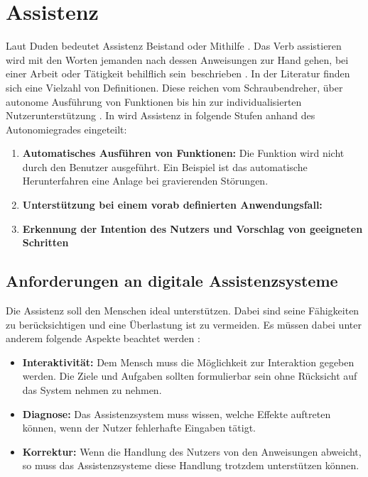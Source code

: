 \section{Assistenz}
Laut Duden bedeutet Assistenz Beistand oder Mithilfe \cite{DudenAssistenz}. Das Verb assistieren wird mit den Worten \glqq jemanden nach dessen Anweisungen zur Hand gehen, bei einer Arbeit oder Tätigkeit behilflich sein\grqq \ beschrieben \cite{DudenAssistieren}. In der Literatur finden sich eine Vielzahl von Definitionen. Diese reichen vom Schraubendreher, über autonome Ausführung von Funktionen bis hin zur individualisierten Nutzerunterstützung \cite{Ludwig}. In \cite{Wandke2005} wird Assistenz in folgende Stufen anhand des Autonomiegrades eingeteilt:
\begin{enumerate}
\item \textbf{Automatisches Ausführen von Funktionen:} Die Funktion wird nicht durch den Benutzer ausgeführt. Ein Beispiel ist das automatische Herunterfahren eine Anlage bei gravierenden Störungen.
\item \textbf{Unterstützung bei einem vorab definierten Anwendungsfall:}
\item \textbf{Erkennung der Intention des Nutzers und Vorschlag von geeigneten Schritten}
\end{enumerate}



\subsection{Anforderungen an digitale Assistenzsysteme}
Die Assistenz soll den Menschen ideal unterstützen. Dabei sind seine Fähigkeiten zu berücksichtigen und eine Überlastung ist zu vermeiden. Es müssen dabei unter anderem folgende Aspekte beachtet werden \cite{Ludwig}:
\begin{itemize}
\item \textbf{Interaktivität:} Dem Mensch muss die Möglichkeit zur Interaktion gegeben werden. Die Ziele und Aufgaben sollten formulierbar sein ohne Rücksicht auf das System nehmen zu nehmen.
\item \textbf{Diagnose:} Das Assistenzsystem muss wissen, welche Effekte auftreten können, wenn der Nutzer fehlerhafte Eingaben tätigt.
\item \textbf{Korrektur:} Wenn die Handlung des Nutzers von den Anweisungen abweicht, so muss das Assistenzsysteme diese Handlung trotzdem unterstützen können.
\end{itemize}

